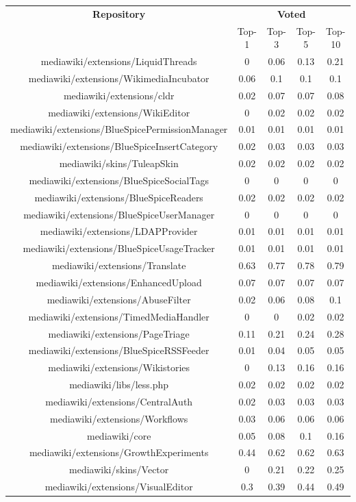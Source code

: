 \begin{center}
\begin{tabular}{@{}c c c c c@{}} 
 \hline
    \textbf{Repository} &
    \multicolumn{4}{c}{\textbf{Voted}} \\
      & {Top-1} & {Top-3} & {Top-5} & {Top-10} \\
      \hline
mediawiki/extensions/LiquidThreads & 0 & 0.06 & 0.13 & 0.21 \\
mediawiki/extensions/WikimediaIncubator & 0.06 & 0.1 & 0.1 & 0.1 \\
mediawiki/extensions/cldr & 0.02 & 0.07 & 0.07 & 0.08 \\
mediawiki/extensions/WikiEditor & 0 & 0.02 & 0.02 & 0.02 \\
mediawiki/extensions/BlueSpicePermissionManager & 0.01 & 0.01 & 0.01 & 0.01 \\
mediawiki/extensions/BlueSpiceInsertCategory & 0.02 & 0.03 & 0.03 & 0.03 \\
mediawiki/skins/TuleapSkin & 0.02 & 0.02 & 0.02 & 0.02 \\
mediawiki/extensions/BlueSpiceSocialTags & 0 & 0 & 0 & 0 \\
mediawiki/extensions/BlueSpiceReaders & 0.02 & 0.02 & 0.02 & 0.02 \\
mediawiki/extensions/BlueSpiceUserManager & 0 & 0 & 0 & 0 \\
mediawiki/extensions/LDAPProvider & 0.01 & 0.01 & 0.01 & 0.01 \\
mediawiki/extensions/BlueSpiceUsageTracker & 0.01 & 0.01 & 0.01 & 0.01 \\
mediawiki/extensions/Translate & 0.63 & 0.77 & 0.78 & 0.79 \\
mediawiki/extensions/EnhancedUpload & 0.07 & 0.07 & 0.07 & 0.07 \\
mediawiki/extensions/AbuseFilter & 0.02 & 0.06 & 0.08 & 0.1 \\
mediawiki/extensions/TimedMediaHandler & 0 & 0 & 0.02 & 0.02 \\
mediawiki/extensions/PageTriage & 0.11 & 0.21 & 0.24 & 0.28 \\
mediawiki/extensions/BlueSpiceRSSFeeder & 0.01 & 0.04 & 0.05 & 0.05 \\
mediawiki/extensions/Wikistories & 0 & 0.13 & 0.16 & 0.16 \\
mediawiki/libs/less.php & 0.02 & 0.02 & 0.02 & 0.02 \\
mediawiki/extensions/CentralAuth & 0.02 & 0.03 & 0.03 & 0.03 \\
mediawiki/extensions/Workflows & 0.03 & 0.06 & 0.06 & 0.06 \\
mediawiki/core & 0.05 & 0.08 & 0.1 & 0.16 \\
mediawiki/extensions/GrowthExperiments & 0.44 & 0.62 & 0.62 & 0.63 \\
mediawiki/skins/Vector & 0 & 0.21 & 0.22 & 0.25 \\
mediawiki/extensions/VisualEditor & 0.3 & 0.39 & 0.44 & 0.49 \\
\hline
\end{tabular}
\end{center}

